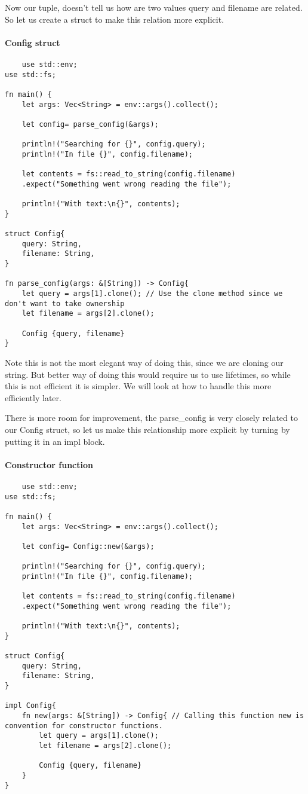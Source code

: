 Now our tuple, doesn't tell us how are two values query and filename are related. So let us create a struct to make this relation more explicit.

\paragraph*{Config struct}\begin{lstlisting}
    use std::env;
use std::fs;

fn main() {
    let args: Vec<String> = env::args().collect(); 
    
    let config= parse_config(&args);

    println!("Searching for {}", config.query);
    println!("In file {}", config.filename);

    let contents = fs::read_to_string(config.filename)
    .expect("Something went wrong reading the file");

    println!("With text:\n{}", contents);
}

struct Config{
    query: String,
    filename: String,
}

fn parse_config(args: &[String]) -> Config{
    let query = args[1].clone(); // Use the clone method since we don't want to take ownership
    let filename = args[2].clone();
    
    Config {query, filename}
} 
\end{lstlisting}

Note this is not the most elegant way of doing this, since we are cloning our string. But better way of doing this would require us to use lifetimes, so while this is not efficient it is simpler. We will look at how to handle this more efficiently later.

There is more room for improvement, the parse\_config is very closely related to our Config struct, so let us make this relationship more explicit by turning by putting it in an impl block.
\paragraph*{Constructor function}\begin{lstlisting}
    use std::env;
use std::fs;

fn main() {
    let args: Vec<String> = env::args().collect(); 
    
    let config= Config::new(&args);

    println!("Searching for {}", config.query);
    println!("In file {}", config.filename);

    let contents = fs::read_to_string(config.filename)
    .expect("Something went wrong reading the file");

    println!("With text:\n{}", contents);
}

struct Config{
    query: String,
    filename: String,
}

impl Config{
    fn new(args: &[String]) -> Config{ // Calling this function new is convention for constructor functions.
        let query = args[1].clone();
        let filename = args[2].clone();
        
        Config {query, filename}
    } 
}
\end{lstlisting}
